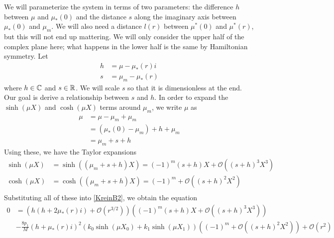 \documentclass[thesis.tex]{subfiles}
\begin{document}
We will parameterize the system in terms of two parameters: the difference $h$ between $\mu$ and $\mu_*(0)$ and the distance $s$ along the imaginary axis between $\mu_*(0)$ and $\mu_m$. We will also need a distance $l(r)$ between $\mu^*(0)$ and $\mu^*(r)$, but this will not end up mattering. We will only consider the upper half of the complex plane here; what happens in the lower half is the same by Hamiltonian symmetry. Let 
\begin{align*}
h &= \mu - \mu_*(r) i \\
s &= \mu_m - \mu_*(r)
\end{align*}
where $h \in \mathbb{C}$ and $s \in \mathbb{R}$. We will scale $s$ so that it is dimensionless at the end. Our goal is derive a relationship between $s$ and $h$. In order to expand the $\sinh(\mu X)$ and $\cosh(\mu X)$ terms around $\mu_m$, we write $\mu$ as
\begin{align*}
\mu &= \mu - \mu_m + \mu_m \\
&= (\mu_*(0) - \mu_m) + h + \mu_m \\
&= \mu_m + s + h
\end{align*}
Using these, we have the Taylor expansions
\begin{align*}
\sinh(\mu X) &= \sinh((\mu_m + s + h)X)
= (-1)^m(s + h)X + \mathcal{O}\left( (s+h)^3 X^3 \right) \\
\cosh(\mu X) &= \cosh((\mu_m + s + h)X)
= (-1)^m + \mathcal{O}\left( (s+h)^2 X^2 \right) \\
\end{align*}
Substituting all of these into \cref{KreinB2}, we obtain the equation
\begin{equation}\label{KreinB3}
\begin{aligned}
0 &= \left( h ( h + 2 \mu_*(r) i) +  \mathcal{O}( r^{3/2} )\right) \left( (-1)^m(s + h)X + \mathcal{O}\left( (s+h)^3 X^3 \right)  \right) \\
&-\frac{8 p_1}{M} ( h + \mu_*(r) i)^2 ( k_0\sinh(\mu X_0) + k_1 \sinh(\mu X_1) ) \left( (-1)^m + \mathcal{O}\left( (s+h)^2 X^2 \right) \right) + \mathcal{O}( r^2 )
\end{aligned}
\end{equation}
\end{document}
